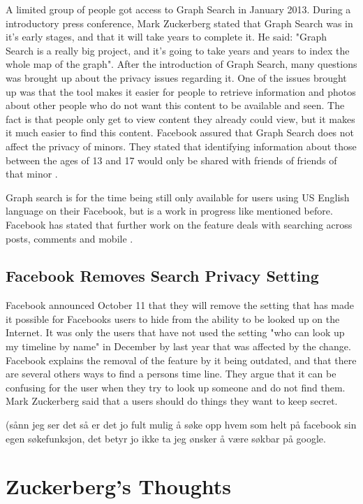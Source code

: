 A limited group of people got access to Graph Search in January 2013. During a introductory press conference, Mark Zuckerberg stated that Graph Search was in it's early stages, and that it will take years to complete it. He said: "Graph Search is a really big project, and it's going to take years and years to index the whole map of the graph". After the introduction of Graph Search, many questions was brought up about the privacy issues regarding it. One of the issues brought up was that the tool makes it easier for people to retrieve information and photos about other people who do not want this content to be available and seen. The fact is that people only get to view content they already could view, but it makes it much easier to find this content. Facebook  assured that Graph Search does not affect the privacy of minors. They stated that identifying information about those between the ages of 13 and 17 would only be shared with friends of friends of that minor \cite{graphsearchcw}. 

Graph search is for the time being still only available for users using US English language on their Facebook, but is a work in progress like mentioned before. Facebook has stated that further work on the feature deals with searching across posts, comments and mobile \cite{graphsearchcw}. 


\subsection{Facebook Removes Search Privacy Setting}
Facebook announced October 11 that they will remove the setting that has made it possible for Facebooks users to hide from the ability to be looked up on the Internet\cite{searchSetting}. It was only the users that have not used the setting "who can look up my timeline by name" in December by last year that was affected by the change. Facebook explains the removal of the feature by it being outdated, and that there are several others ways to find a persons time line. They argue that it can be confusing for the user when they try to look up someone and do not find them. Mark Zuckerberg said that a users should do things they want to keep secret.

(sånn jeg ser det så er det jo fult mulig å søke opp hvem som helt på facebook sin egen søkefunksjon, det betyr jo ikke ta jeg ønsker å være søkbar på google. 


\section{Zuckerberg's Thoughts}

